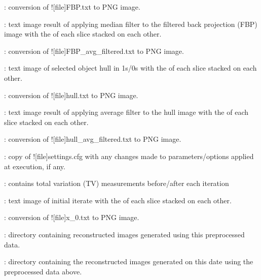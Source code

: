 \begin{tcbenvironment}
\begin{tcbparagraph}
\begin{ThinEnum}
\begin{ThinEnum}
\begin{ThinEnum}
\begin{ThinEnum}
\begin{ThinEnum}
\begin{ThinEnum}
\begin{ThinEnum}
\begin{ThinEnum}
\begin{ThinEnum}
                                        	\item {} : conversion of \docentry![file]{FBP.txt} to PNG image.
                                        	\item {} : text image result of applying median filter to the filtered back projection (FBP) image with the \xyplane* of each slice stacked on each other.
                                        	\item {} : conversion of \docentry![file]{FBP\_avg\_filtered.txt} to PNG image.
                                        	\item {} : text image of selected object hull in 1s/0s with the \xyplane* of each slice stacked on each other.
                                        	\item {} : conversion of \docentry![file]{hull.txt} to PNG image.
                                        	\item {} : text image result of applying average filter to the hull image with the \xyplane* of each slice stacked on each other.
							\item {} : conversion of \docentry![file]{hull\_avg\_filtered.txt} to PNG image.
							\item {} : copy of \docentry![file]{settings.cfg} with any changes made to parameters/options applied at execution, if any.
                                        	\item {} : contains total variation (TV) measurements before/after each iteration
                                        	\item {} : text image of initial iterate with the \xyplane* of each slice stacked on each other.
                                        \item {} : conversion of \docentry![file]{x\_0.txt} to PNG image.
                                        \item {} : directory containing reconstructed images generated using this preprocessed data.
                                        \begin{ThinEnum}
                                            \item {} : directory containing the reconstructed images generated on this date using the preprocessed data above.

\end{ThinEnum}
\end{ThinEnum}
\end{ThinEnum}
\end{ThinEnum}
\end{ThinEnum}
\end{ThinEnum}
\end{ThinEnum}
\end{ThinEnum}
\end{ThinEnum}
\end{ThinEnum}
\end{tcbparagraph}
\end{tcbenvironment}
